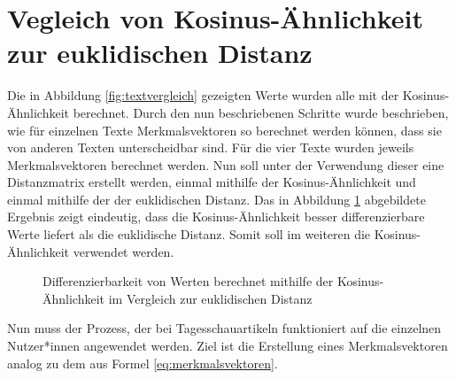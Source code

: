 \section{Vegleich von Kosinus-Ähnlichkeit zur euklidischen Distanz}
Die in Abbildung \ref{fig:textvergleich} gezeigten Werte wurden alle mit der Kosinus-Ähnlichkeit berechnet. Durch den nun beschriebenen Schritte wurde beschrieben, wie für einzelnen Texte Merkmalsvektoren so berechnet werden können, dass sie von anderen Texten unterscheidbar sind. Für die vier Texte wurden jeweils Merkmalsvektoren berechnet werden. Nun soll unter der Verwendung dieser eine Distanzmatrix erstellt werden, einmal mithilfe der Kosinus-Ähnlichkeit und einmal mithilfe der der euklidischen Distanz. Das in Abbildung \ref{fig:calcvergleich} abgebildete Ergebnis zeigt eindeutig, dass die Kosinus-Ähnlichkeit besser differenzierbare Werte liefert als die euklidische Distanz. Somit soll im weiteren die Kosinus-Ähnlichkeit verwendet werden.
\begin{figure}
	\centering
	
	
	\caption{Differenzierbarkeit von Werten berechnet mithilfe der Kosinus-Ähnlichkeit im Vergleich zur euklidischen Distanz}
	\label{fig:calcvergleich}
\end{figure}
Nun muss der Prozess, der bei Tagesschauartikeln funktioniert auf die einzelnen Nutzer*innen angewendet werden. Ziel ist die Erstellung eines Merkmalsvektoren analog zu dem aus Formel \ref{eq:merkmalsvektoren}. 
